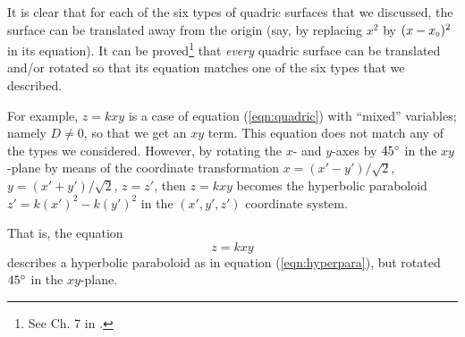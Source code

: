 It is clear that for each of the six types of quadric surfaces that we discussed, the surface can be translated away
from the origin 
(say, by replacing $x^2$ by $(x - x_{\scriptscriptstyle 0})^2$ in its equation). 
It can be proved\footnote{See
Ch. 7 in \cite{pog}.}
that \emph{every}
quadric surface can be translated and/or rotated so that its equation matches one of the six types that we described.

For example, $z = k xy$ is a case of equation (\ref{eqn:quadric}) with ``mixed'' variables;
namely $D \ne 0$, so that we get an $xy$ term. 
This equation does not match any of the types we considered. 
However, by rotating the $x$-
and $y$-axes by $45^\circ$ in the $xy$-plane by means of the coordinate transformation
$x = (x' - y')/\sqrt{2}$, $y = (x' + y')/\sqrt{2}$, $z = z'$, then $z = kxy$ becomes
the hyperbolic paraboloid $z' = k(x')^2 - k(y')^2$ in the $(x',y',z')$ coordinate system. 

That is, the equation
\begin{equation}\label{eqn:hyperpara-xy}
z = kxy
\end{equation}
describes a hyperbolic paraboloid as in equation (\ref{eqn:hyperpara}), but rotated $45^\circ$ in the $xy$-plane.

